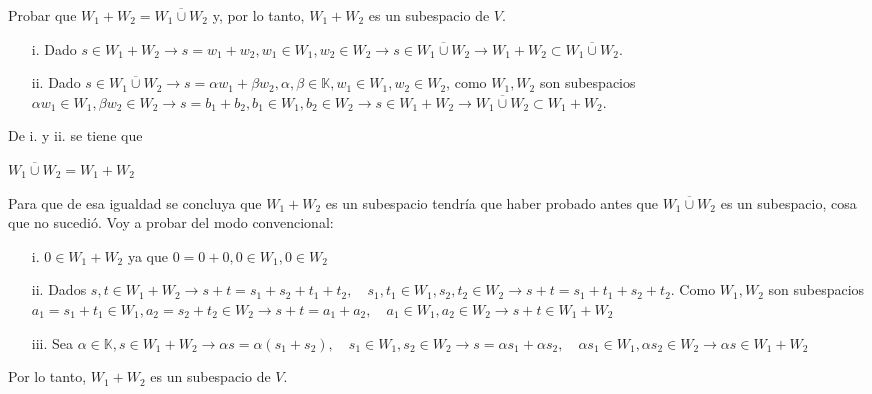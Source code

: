 \item Probar que $W_1+W_2=\overline{W_1\cup W_2}$ y, por lo tanto, $W_1+W_2$ es un subespacio de $V$.
    \begin{mdframed}[style=s]
        \begin{enumerate}
            \item[i.] Dado $s\in W_1+W_2\to s=w_1+w_2, w_1\in W_1,w_2\in W_2\to s\in \overline{W_1\cup W_2}\to W_1+W_2\subset\overline{W_1\cup W_2}$.
            \item[ii.] Dado $s\in\overline{W_1\cup W_2}\to s=\alpha w_1+\beta w_2,\alpha,\beta\in\mathbb{K},w_1\in W_1,w_2\in W_2$, como $W_1,W_2$ son subespacios $\alpha w_1\in W_1, \beta w_2\in W_2\to s=b_1+b_2, b_1\in W_1,b_2\in W_2\to s\in W_1+W_2\to\overline{W_1\cup W_2}\subset W_1+W_2$.
        \end{enumerate}
        De i. y ii. se tiene que
        \begin{tightcenter}
            $\overline{W_1\cup W_2}=W_1+W_2$
        \end{tightcenter}
        Para que de esa igualdad se concluya que $W_1+W_2$ es un subespacio tendría que haber probado antes que $\overline{W_1\cup W_2}$ es un subespacio, cosa que no sucedió. Voy a probar del modo convencional:
        \begin{enumerate}
            \item[i.] $0\in W_1+W_2$ ya que $0=0+0,0\in W_1,0\in W_2$
            \item[ii.] Dados $s,t\in W_1+W_2\to s+t=s_1+s_2+t_1+t_2,\quad s_1,t_1\in W_1, s_2,t_2\in W_2\to s+t=s_1+t_1+s_2+t_2$. Como $W_1,W_2$ son subespacios \\
                $a_1=s_1+t_1\in W_1, a_2=s_2+t_2\in W_2\to s+t=a_1+a_2,\quad a_1\in W_1, a_2\in W_2\to s+t\in W_1+W_2$ 
            \item[iii.] Sea $\alpha\in\mathbb{K},s\in W_1+W_2\to \alpha s=\alpha(s_1+s_2),\quad s_1\in W_1,s_2\in W_2\to s=\alpha s_1+\alpha s_2,\quad \alpha s_1\in W_1, \alpha s_2\in W_2\to\alpha s\in W_1+W_2$
        \end{enumerate}
        Por lo tanto, $W_1+W_2$ es un subespacio de $V$.
    \end{mdframed}